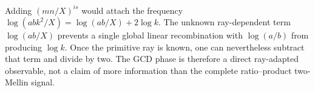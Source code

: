 \begin{remark}
Adding $(mn/X)^{is}$ would attach the frequency
$\log(abk^2/X)=\log(ab/X)+2\log k$.  The unknown ray-dependent term
$\log(ab/X)$ prevents a single global linear recombination with
$\log(a/b)$ from producing $\log k$.  Once the primitive ray is known,
one can nevertheless subtract that term and divide by two.  The GCD
phase is therefore a direct ray-adapted observable, not a claim of more
information than the complete ratio--product two-Mellin signal.
\end{remark}
